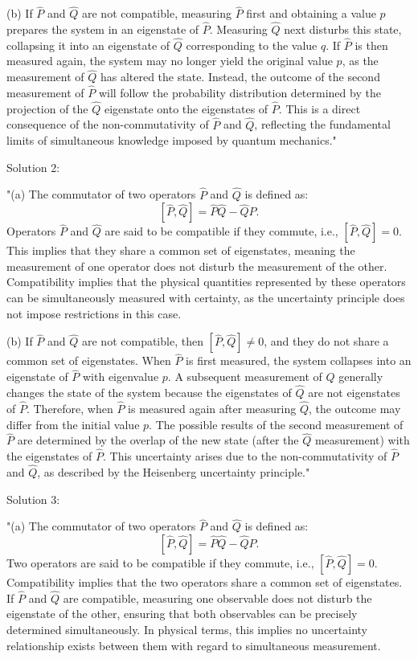 (b) If $\hat{P}$ and $\hat{Q}$ are not compatible, measuring $\hat{P}$ first and obtaining a value $p$ prepares the system in an eigenstate of $\hat{P}$. Measuring $\hat{Q}$ next disturbs this state, collapsing it into an eigenstate of $\hat{Q}$ corresponding to the value $q$. If $\hat{P}$ is then measured again, the system may no longer yield the original value $p$, as the measurement of $\hat{Q}$ has altered the state. Instead, the outcome of the second measurement of $\hat{P}$ will follow the probability distribution determined by the projection of the $\hat{Q}$ eigenstate onto the eigenstates of $\hat{P}$. This is a direct consequence of the non-commutativity of $\hat{P}$ and $\hat{Q}$, reflecting the fundamental limits of simultaneous knowledge imposed by quantum mechanics."

Solution 2: 

"(a) The commutator of two operators $\hat{P}$ and $\hat{Q}$ is defined as:
\[
[\hat{P}, \hat{Q}] = \hat{P}\hat{Q} - \hat{Q}\hat{P}.
\]
Operators $\hat{P}$ and $\hat{Q}$ are said to be compatible if they commute, i.e., $[\hat{P}, \hat{Q}] = 0$. This implies that they share a common set of eigenstates, meaning the measurement of one operator does not disturb the measurement of the other. Compatibility implies that the physical quantities represented by these operators can be simultaneously measured with certainty, as the uncertainty principle does not impose restrictions in this case.

(b) If $\hat{P}$ and $\hat{Q}$ are not compatible, then $[\hat{P}, \hat{Q}] \neq 0$, and they do not share a common set of eigenstates. When $\hat{P}$ is first measured, the system collapses into an eigenstate of $\hat{P}$ with eigenvalue $p$. A subsequent measurement of $\hat{Q}$ generally changes the state of the system because the eigenstates of $\hat{Q}$ are not eigenstates of $\hat{P}$. Therefore, when $\hat{P}$ is measured again after measuring $\hat{Q}$, the outcome may differ from the initial value $p$. The possible results of the second measurement of $\hat{P}$ are determined by the overlap of the new state (after the $\hat{Q}$ measurement) with the eigenstates of $\hat{P}$. This uncertainty arises due to the non-commutativity of $\hat{P}$ and $\hat{Q}$, as described by the Heisenberg uncertainty principle."

Solution 3:

"(a) The commutator of two operators $\hat{P}$ and $\hat{Q}$ is defined as:
\[
[\hat{P}, \hat{Q}] = \hat{P}\hat{Q} - \hat{Q}\hat{P}.
\]
Two operators are said to be compatible if they commute, i.e., $[\hat{P}, \hat{Q}] = 0$. Compatibility implies that the two operators share a common set of eigenstates. If $\hat{P}$ and $\hat{Q}$ are compatible, measuring one observable does not disturb the eigenstate of the other, ensuring that both observables can be precisely determined simultaneously. In physical terms, this implies no uncertainty relationship exists between them with regard to simultaneous measurement.

